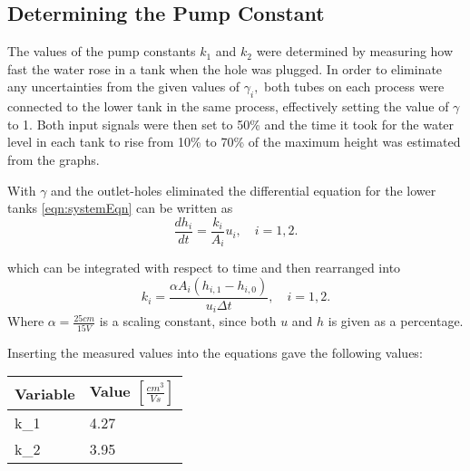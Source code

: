 \documentclass[a4paper,12pt,oneside,onecolumn]{article}
\begin{document}
\subsection{Determining the Pump Constant}
The values of the pump constants $k_1$ and $k_2$ were determined by measuring how fast the water rose in a tank when the hole was plugged. In order to eliminate any uncertainties from the given values of $\gamma_i,$ both tubes on each process were connected to the lower tank in the same process, effectively setting the value of $\gamma$ to 1. Both input signals were then set to 50\% and the time it took for the water level in each tank to rise from 10\% to 70\% of the maximum height was estimated from the graphs. 

With $\gamma$ and the outlet-holes eliminated the differential equation for the lower tanks \eqref{eqn:systemEqn} can be written as
\begin{equation}
    \frac{dh_i}{dt}=\frac{k_i}{A_i}u_i, \quad i = 1,2.
\end{equation} 

which can be integrated with respect to time and then rearranged into 
\begin{equation}
    k_i = \frac{\alpha A_i (h_{i, 1} - h_{i, 0})}{u_i\Delta t}, \quad i = 1,2.
\end{equation} 
Where $\alpha = \frac{25 cm}{15 V}$ is a scaling constant, since both $u$ and $h$ is given as a percentage.

Inserting the measured values into the equations gave the following values:
\begin{center}
\begin{tabular}{|l|l|}
Variable & Value $[\frac{cm^3}{Vs}]$ \\
\hline
k_1 &  4.27\\
k_2 & 3.95
\end{tabular}
\end{center}

\end{document}
